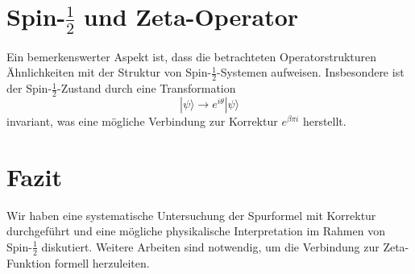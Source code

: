 \documentclass[a4paper,12pt]{article}
\begin{document}
\section{Spin-\(\frac{1}{2}\) und Zeta-Operator}

Ein bemerkenswerter Aspekt ist, dass die betrachteten Operatorstrukturen Ähnlichkeiten mit der Struktur von Spin-\(\frac{1}{2}\)-Systemen aufweisen. Insbesondere ist der Spin-\(\frac{1}{2}\)-Zustand durch eine Transformation 
\[
|\psi\rangle \to e^{i\theta} |\psi\rangle
\]
invariant, was eine mögliche Verbindung zur Korrektur \( e^{\beta \pi i} \) herstellt.

\section{Fazit}

Wir haben eine systematische Untersuchung der Spurformel mit Korrektur durchgeführt und eine mögliche physikalische Interpretation im Rahmen von Spin-\(\frac{1}{2}\) diskutiert. Weitere Arbeiten sind notwendig, um die Verbindung zur Zeta-Funktion formell herzuleiten.
\end{document}
